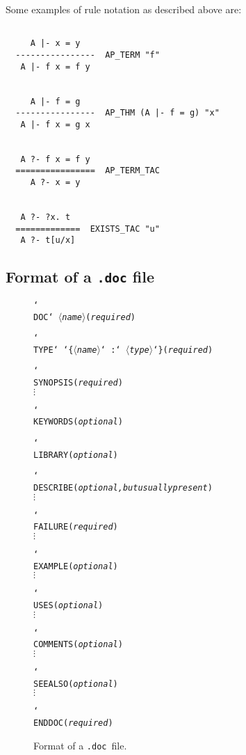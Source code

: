 \documentclass[12pt]{article}
\def\doc{{\tt .doc}}
\def\vsp{{\tt\char`\ }}
\def\bk{{\tt\char`\\ }}
\def\lb{{\tt\char`\{}}
\def\rb{{\tt\char`\}}}
\def\meta#1{\(\langle\){\it #1}\(\rangle\)}
\begin{document}
Some examples of rule notation as described above are:

\begin{verbatim}

     A |- x = y
  ----------------  AP_TERM "f"
   A |- f x = f y


     A |- f = g
  ----------------  AP_THM (A |- f = g) "x"
   A |- f x = g x


   A ?- f x = f y
  ================  AP_TERM_TAC
     A ?- x = y


   A ?- ?x. t
  =============  EXISTS_TAC "u"
   A ?- t[u/x]

\end{verbatim}

\newpage

\subsection{Format of a {\tt .doc} file}

\begin{figure}[h]
\begin{boxed}\begin{alltt}
\bk{DOC}\vsp\meta{name}                            ({\it required} )

\bk{TYPE}\vsp\lb\meta{name}\vsp:\vsp\meta{type}\rb                 ({\it required} )

\bk{SYNOPSIS}                              ({\it required} )
\(\vdots\)

\bk{KEYWORDS}                              ({\it optional})

\bk{LIBRARY}                               ({\it optional})

\bk{DESCRIBE}                              ({\it optional, but usually present} )
\(\vdots \)

\bk{FAILURE}                               ({\it required} )
\(\vdots \)

\bk{EXAMPLE}                               ({\it optional} )
\(\vdots \)

\bk{USES}                                  ({\it optional} )
\(\vdots \)

\bk{COMMENTS}                              ({\it optional} )
\(\vdots \)

\bk{SEEALSO}                               ({\it optional} )
\(\vdots \)

\bk{ENDDOC}                                ({\it required} )
\end{alltt}\end{boxed}
\caption{Format of a \doc\ file.\label{doc-fig}}
\end{figure}
\end{document}
